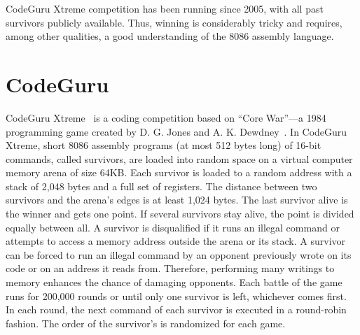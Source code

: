 \documentclass[dvipsnames, format=sigconf]{acmart}
\begin{document}
CodeGuru Xtreme competition has been running since 2005, with all past survivors publicly available. Thus, winning is considerably tricky and requires, among other qualities, a good understanding of the 8086 assembly language. %



\vspace{-.2cm}
\section{CodeGuru}
\label{sec:codeguru}
CodeGuru Xtreme~\cite{codeguru_repo} is a coding competition based on ``Core War''---a 1984 programming game created by D. G. Jones and A. K. Dewdney~\cite{dewdney1984recreational}.
In CodeGuru Xtreme, short 8086 assembly programs (at most 512 bytes long) of 16-bit commands, called survivors, are loaded into random space on a virtual computer memory arena of size 64KB. Each survivor is loaded to a random address with a stack of 2,048 bytes and a full set of registers. The distance between two survivors and the arena's edges is at least 1,024 bytes.
The last survivor alive is the winner and gets one point. If several survivors stay alive, the point is divided equally between all.
A survivor is disqualified if it runs an illegal command or attempts to access a memory address outside the arena or its stack. A survivor can be forced to run an illegal command by an opponent previously wrote on its code or on an address it reads from. Therefore, performing many writings to memory enhances the chance of damaging opponents.
Each battle of the game runs for 200,000 rounds or until only one survivor is left, whichever comes first. In each round, the next command of each survivor is executed in a round-robin fashion. The order of the survivor's is randomized for each game. 
\end{document}
